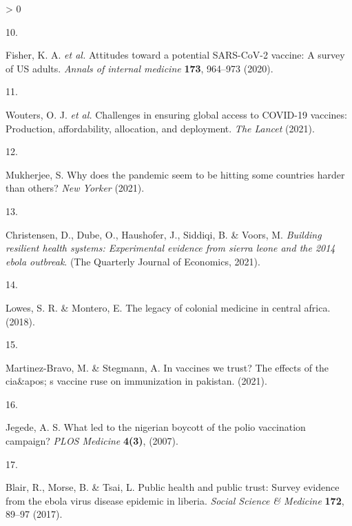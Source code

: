 \documentclass[
  12pt,
]{article}
\newlength{\cslhangindent}
\newlength{\csllabelwidth}
\newenvironment{CSLReferences}[2] %
 {%
  \setlength{\parindent}{0pt}
  \ifodd #1 \everypar{\setlength{\hangindent}{\cslhangindent}}\ignorespaces\fi
  \ifnum #2 > 0
  \setlength{\parskip}{#2\baselineskip}
  \fi
 }%
 {}
\newcommand{\CSLLeftMargin}[1]{\parbox[t]{\csllabelwidth}{#1}}
\newcommand{\CSLRightInline}[1]{\parbox[t]{\linewidth - \csllabelwidth}{#1}\break}
\providecommand{\DIFaddbegin}{} %
\providecommand{\DIFaddend}{} %
\providecommand{\DIFdelbegin}{} %
\providecommand{\DIFdelend}{} %
\newcommand{\DIFscaledelfig}{0.5}
\newlength{\DIFdelgraphicswidth} %
\newlength{\DIFdelgraphicsheight} %
\newcommand{\DIFaddincludegraphics}[2][]{{\color{blue}\fbox{\DIFOincludegraphics[#1]{#2}}}} %
\newcommand{\DIFdelincludegraphics}[2][]{%
\sbox{\DIFdelgraphicsbox}{\DIFOincludegraphics[#1]{#2}}%
\settoboxwidth{\DIFdelgraphicswidth}{\DIFdelgraphicsbox} %
\settoboxtotalheight{\DIFdelgraphicsheight}{\DIFdelgraphicsbox} %
\scalebox{\DIFscaledelfig}{%
\parbox[b]{\DIFdelgraphicswidth}{\usebox{\DIFdelgraphicsbox}\\[-\baselineskip] \rule{\DIFdelgraphicswidth}{0em}}\llap{\resizebox{\DIFdelgraphicswidth}{\DIFdelgraphicsheight}{%
\setlength{\unitlength}{\DIFdelgraphicswidth}%
\begin{picture}(1,1)%
\thicklines\linethickness{2pt} %
{\color[rgb]{1,0,0}\put(0,0){\framebox(1,1){}}}%
{\color[rgb]{1,0,0}\put(0,0){\line( 1,1){1}}}%
{\color[rgb]{1,0,0}\put(0,1){\line(1,-1){1}}}%
\end{picture}%
}\hspace*{3pt}}} %
} %
\DeclareRobustCommand{\DIFaddbegin}{\DIFOaddbegin \let\includegraphics\DIFaddincludegraphics} %
\DeclareRobustCommand{\DIFaddend}{\DIFOaddend \let\includegraphics\DIFOincludegraphics} %
\DeclareRobustCommand{\DIFdelbegin}{\DIFOdelbegin \let\includegraphics\DIFdelincludegraphics} %
\DeclareRobustCommand{\DIFdelend}{\DIFOaddend \let\includegraphics\DIFOincludegraphics} %
\begin{document}
\begin{CSLReferences}{0}{0}
\leavevmode\hypertarget{ref-fisher2020attitudes}{}%
\CSLLeftMargin{10. }
\CSLRightInline{Fisher, K. A. \emph{et al.} Attitudes toward a potential SARS-CoV-2 vaccine: A survey of US adults. \emph{Annals of internal medicine} \textbf{173}, 964--973 (2020).}

\leavevmode\hypertarget{ref-wouters2021challenges}{}%
\CSLLeftMargin{11. }
\CSLRightInline{Wouters, O. J. \emph{et al.} Challenges in ensuring global access to COVID-19 vaccines: Production, affordability, allocation, and deployment. \emph{The Lancet} (2021).}

\leavevmode\hypertarget{ref-mukherjee}{}%
\CSLLeftMargin{12. }
\DIFaddend \CSLRightInline{Mukherjee, S. Why does the pandemic seem to be hitting some countries harder than others? \emph{New Yorker} (2021).}

\leavevmode\hypertarget{ref-christensen2020building}{}%
\DIFdelbegin %
\DIFdelend \DIFaddbegin \CSLLeftMargin{13. }
\DIFaddend \CSLRightInline{Christensen, D., Dube, O., Haushofer, J., Siddiqi, B. \& Voors, M. \emph{Building resilient health systems: Experimental evidence from sierra leone and the 2014 ebola outbreak}. (The Quarterly Journal of Economics, 2021).}

\leavevmode\hypertarget{ref-Lowes2018}{}%
\DIFdelbegin %
\DIFdelend \DIFaddbegin \CSLLeftMargin{14. }
\DIFaddend \CSLRightInline{Lowes, S. R. \& Montero, E. The legacy of colonial medicine in central africa. (2018).}

\leavevmode\DIFaddbegin \hypertarget{ref-martinez2021vaccines}{}%
\CSLLeftMargin{15. }
\CSLRightInline{Martinez-Bravo, M. \& Stegmann, A. In vaccines we trust? The effects of the cia\&apos; s vaccine ruse on immunization in pakistan. (2021).}

\leavevmode\DIFaddend \hypertarget{ref-Jegede2007}{}%
\DIFdelbegin %
\DIFdelend \DIFaddbegin \CSLLeftMargin{16. }
\DIFaddend \CSLRightInline{Jegede, A. S. What led to the nigerian boycott of the polio vaccination campaign? \emph{PLOS Medicine} \textbf{4(3)}, (2007).}

\leavevmode\hypertarget{ref-BLAIR201789}{}%
\DIFdelbegin %
\DIFdelend \DIFaddbegin \CSLLeftMargin{17. }
\DIFaddend \CSLRightInline{Blair, R., Morse, B. \& Tsai, L. Public health and public trust: Survey evidence from the ebola virus disease epidemic in liberia. \emph{Social Science \& Medicine} \textbf{172}, 89--97 (2017).}


\end{CSLReferences}
\end{document}
